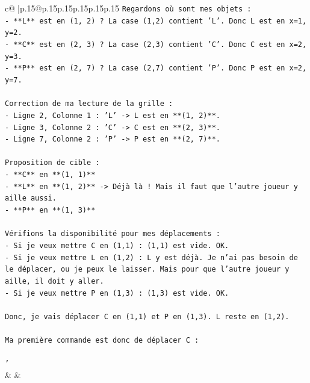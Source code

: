 \documentclass{article}
\begin{document}
{\begin{supertabular}{c@{$\;$}|p{.15\linewidth}@{}p{.15\linewidth}p{.15\linewidth}p{.15\linewidth}p{.15\linewidth}p{.15\linewidth}}
{{{\texttt{Regardons où sont mes objets :} \\
\texttt{{-} **L** est en (1, 2) ? La case (1,2) contient 'L'. Donc L est en x=1, y=2.} \\
\texttt{{-} **C** est en (2, 3) ? La case (2,3) contient 'C'. Donc C est en x=2, y=3.} \\
\texttt{{-} **P** est en (2, 7) ? La case (2,7) contient 'P'. Donc P est en x=2, y=7.} \\
\\ 
\texttt{Correction de ma lecture de la grille :} \\
\texttt{{-} Ligne 2, Colonne 1 : 'L' {-}> L est en **(1, 2)**.} \\
\texttt{{-} Ligne 3, Colonne 2 : 'C' {-}> C est en **(2, 3)**.} \\
\texttt{{-} Ligne 7, Colonne 2 : 'P' {-}> P est en **(2, 7)**.} \\
\\ 
\texttt{Proposition de cible :} \\
\texttt{{-} **C** en **(1, 1)**} \\
\texttt{{-} **L** en **(1, 2)** {-}> Déjà là ! Mais il faut que l'autre joueur y aille aussi.} \\
\texttt{{-} **P** en **(1, 3)**} \\
\\ 
\texttt{Vérifions la disponibilité pour mes déplacements :} \\
\texttt{{-} Si je veux mettre C en (1,1) : (1,1) est vide. OK.} \\
\texttt{{-} Si je veux mettre L en (1,2) : L y est déjà. Je n'ai pas besoin de le déplacer, ou je peux le laisser. Mais pour que l'autre joueur y aille, il doit y aller.} \\
\texttt{{-} Si je veux mettre P en (1,3) : (1,3) est vide. OK.} \\
\\ 
\texttt{Donc, je vais déplacer C en (1,1) et P en (1,3). L reste en (1,2).} \\
\\ 
\texttt{Ma première commande est donc de déplacer C :} \\
\\ 
\texttt{'} \\
            }
        }
    }
    & & \\ \\


\end{supertabular}}
\end{document}
